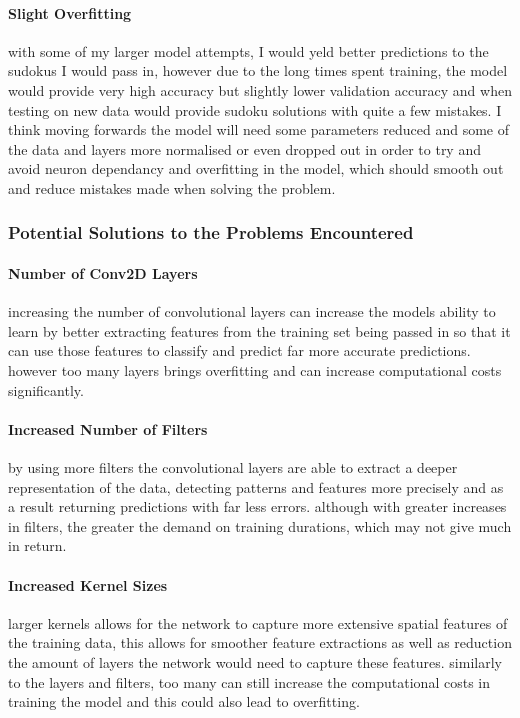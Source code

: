 \documentclass[]{final_report}
\begin{document}
\paragraph{Slight Overfitting}
with some of my larger model attempts, I would yeld better predictions to the sudokus I would pass in, however due to the long times spent training, the model would provide very high accuracy but slightly lower validation accuracy and when testing on new data would provide sudoku solutions with quite a few mistakes. I think moving forwards the model will need some parameters reduced and some of the data and layers more normalised or even dropped out in order to try and avoid neuron dependancy and overfitting in the model, which should smooth out and reduce mistakes made when solving the problem.

\subsubsection{Potential Solutions to the Problems Encountered}

\paragraph{Number of Conv2D Layers}
increasing the number of convolutional layers can increase the models ability to learn by better extracting features from the training set being passed in so that it can use those features to classify and predict far more accurate predictions. however too many layers brings overfitting and can increase computational costs significantly.

\paragraph{Increased Number of Filters}
by using more filters the convolutional layers are able to extract a deeper representation of the data, detecting patterns and features more precisely and as a result returning predictions with far less errors. although with greater increases in filters, the greater the demand on training durations, which may not give much in return.

\paragraph{Increased Kernel Sizes}
larger kernels allows for the network to capture more extensive spatial features of the training data, this allows for smoother feature extractions as well as reduction the amount of layers the network would need to capture these features. similarly to the layers and filters, too many can still increase the computational costs in training the model and this could also lead to overfitting.
\end{document}
